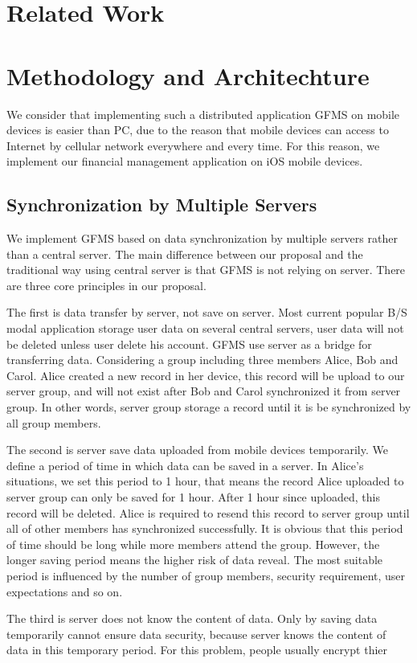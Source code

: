 \documentclass[twocolumn,10pt]{article}
\begin{document}
\section{Related Work}

\section{Methodology and Architechture}

We consider that implementing such a distributed application GFMS on mobile devices is easier than PC, due to the reason that mobile devices can access to Internet by cellular network everywhere and every time. For this reason, we implement our financial management application on iOS mobile devices. 

\subsection{Synchronization by Multiple Servers}
We implement GFMS based on data synchronization by multiple servers rather than a central server. The main difference between our proposal and the traditional way using central server is that GFMS is not relying on server. There are three core principles in our proposal. 

The first is data transfer by server, not save on server. Most current popular B/S modal application storage user data on several central servers, user data will not be deleted unless user delete his account. GFMS use server as a bridge for transferring data. Considering a group including three members Alice, Bob and Carol. Alice created a new record in her device, this record will be upload to our server group, and will not exist after Bob and Carol synchronized it from server group. In other words, server group  storage a record until it is be synchronized by all group members.

The second is server save data uploaded from mobile devices temporarily. We define a period of time in which data can be saved in a server. In Alice's situations, we set this period to 1 hour, that means the record Alice uploaded to server group can only be saved for 1 hour. After 1 hour since uploaded, this record will be deleted. Alice is required to resend this record to server group until all of other members has synchronized successfully. It is obvious that this period of time should be long while more members attend the group. However, the longer saving period means the higher risk of data reveal. The most suitable period is influenced by the number of group members, security requirement, user expectations and so on. 

The third is server does not know the content of data. Only by saving data temporarily cannot ensure data security, because server knows the content of data in this temporary period. For this problem, people usually encrypt thier
\end{document}
